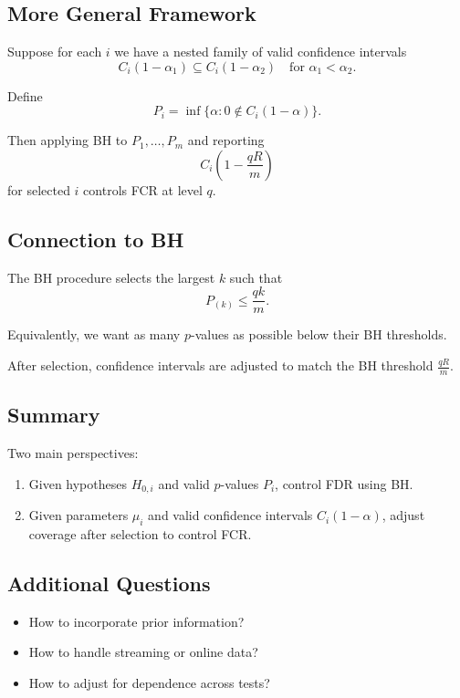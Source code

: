 \documentclass{article}
\begin{document}
\subsection*{More General Framework}

Suppose for each $i$ we have a nested family of valid confidence intervals
\[
C_i(1-\alpha_1) \subseteq C_i(1-\alpha_2)
\quad \text{for } \alpha_1 < \alpha_2.
\]

Define
\[
P_i = \inf\{\alpha : 0 \notin C_i(1-\alpha)\}.
\]

Then applying BH to $P_1,\dots,P_m$ and reporting
\[
C_i\left(1 - \frac{qR}{m}\right)
\]
for selected $i$ controls FCR at level $q$.

\subsection*{Connection to BH}

The BH procedure selects the largest $k$ such that
\[
P_{(k)} \le \frac{qk}{m}.
\]

Equivalently, we want as many $p$-values as possible below their BH thresholds.

After selection, confidence intervals are adjusted to match the BH threshold $\frac{qR}{m}$.

\subsection*{Summary}

Two main perspectives:

\begin{enumerate}
\item Given hypotheses $H_{0,i}$ and valid $p$-values $P_i$, control FDR using BH.
\item Given parameters $\mu_i$ and valid confidence intervals $C_i(1-\alpha)$, adjust coverage after selection to control FCR.
\end{enumerate}

\subsection*{Additional Questions}

\begin{itemize}
\item How to incorporate prior information?
\item How to handle streaming or online data?
\item How to adjust for dependence across tests?
\end{itemize}
\end{document}
